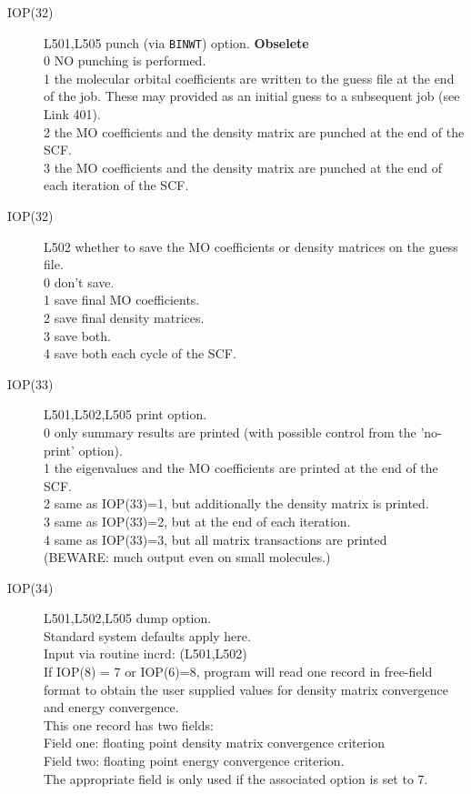 \begin{description}
\item[IOP(32)] L501,L505  punch (via {\tt BINWT}) option. {\bf Obselete}  \\
0  NO punching is performed. \\
1  the molecular orbital coefficients are written to the guess file 
at the end of the job.  These may provided as an initial guess to
a subsequent job (see Link 401).  \\
2  the MO coefficients and the density matrix are punched at the end 
of the SCF.  \\
3  the MO coefficients and the density matrix are punched at the end 
of each iteration of the SCF.  \\
\item[IOP(32)] L502 whether to save the MO coefficients or density matrices
on the guess file.  \\
0  don't save. \\
1  save final MO coefficients. \\
2  save final density matrices. \\
3  save both. \\
4  save both each cycle of the SCF. \\
\item[IOP(33)] L501,L502,L505 print option.  \\
0  only summary results are printed (with possible control from the 
'no-print' option).  \\
1  the eigenvalues and the MO coefficients are printed at the end of 
the SCF.  \\
2  same as IOP(33)=1, but additionally the density matrix is 
printed.  \\
3  same as IOP(33)=2, but at the end of each iteration. \\
4  same as IOP(33)=3, but all matrix transactions are printed \\
(BEWARE: much output even on small molecules.)
\item[IOP(34)] L501,L502,L505  dump option.  \\
Standard system defaults apply here.  \\
Input via routine incrd: (L501,L502)  \\
If IOP(8) = 7 or IOP(6)=8, program will read one record in
free-field format to obtain the user supplied values for density matrix
convergence and energy convergence.  \\
This one record has two fields:  \\
Field one: floating point  density matrix convergence criterion  \\
Field two: floating point  energy convergence criterion.  \\
The appropriate field is only used if the associated option
is set to 7.  \\
\end{description}
